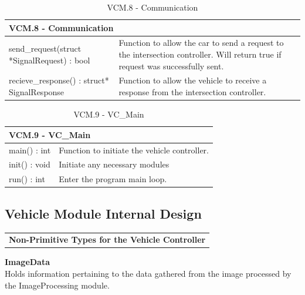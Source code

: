 \documentclass [10pt]{article}
\begin{document}
\begin{longtable}{| p{ } | p{ } | }\caption{VCM.8 - Communication} \\\hline  
 \multicolumn{2}{|l|}{\textbf {VCM.8 - Communication}}\\ \hline
\cellcolor{tableCell}send\_request(struct *SignalRequest) : bool & \cellcolor{tableCell}Function to allow the car to send a request to the intersection controller. Will return true if request was successfully sent. \\ \hline 

recieve\_response() : struct* SignalResponse  &Function to allow the vehicle to receive a response from the intersection controller. \\ \hline 

\end{longtable}


\begin{longtable}{| p{ } | p{ } | }\caption{VCM.9 - VC\_Main} \\\hline  
 \multicolumn{2}{|l|}{\textbf {VCM.9 - VC\_Main}}\\ \hline
\cellcolor{tableCell}main() : int & \cellcolor{tableCell}Function to initiate the vehicle controller.  \\ \hline 

init() : void & Initiate any necessary modules \\ \hline

\cellcolor{tableCell}run() : int & \cellcolor{tableCell}Enter the program main loop.  \\ \hline 
\end{longtable}






\subsection{Vehicle Module Internal Design}

\begin{longtable}{p{}}

\rowcolor{tableCell}\textbf{Non-Primitive Types for the Vehicle Controller} \\
\end{longtable}
\textbf{ImageData}\\
\indent Holds information pertaining to the data gathered from the image processed by the ImageProcessing module. \\
\end{document}

